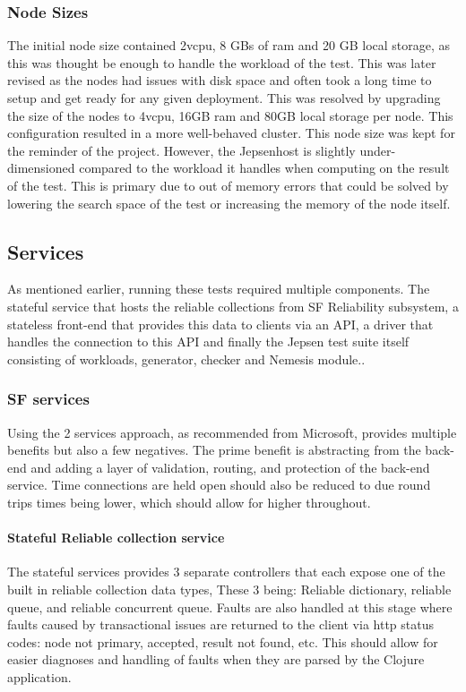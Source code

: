 \documentclass[a4paper,10pt,titlepage]{report}
\begin{document}
    \subsubsection*{Node Sizes}

    The initial node size contained 2vcpu, 8 GBs of ram and 20 GB local storage, as this was thought be enough to handle the workload of the test. This was later revised as the nodes had issues with disk space and often took a long time to setup and get ready for any given deployment. This was resolved by upgrading the size of the nodes to 4vcpu, 16GB ram and 80GB local storage per node. This configuration resulted in a more well-behaved cluster. This node size was kept for the reminder of the project. However, the Jepsenhost is slightly under-dimensioned compared to the workload it handles when computing on the result of the test. This is primary due to out of memory errors that could be solved by lowering the search space of the test or increasing the memory of the node itself.


    \subsection{Services}
    As mentioned earlier, running these tests required multiple components. The stateful service that hosts the reliable collections from SF Reliability subsystem, a stateless front-end that provides this data to clients via an API, a driver that handles the connection to this API and finally the Jepsen test suite itself consisting of workloads, generator, checker and Nemesis module..

    \subsubsection{SF services}
    Using the 2 services approach, as recommended from Microsoft, provides multiple benefits but also a few negatives. The prime benefit is abstracting from the back-end and adding a layer of validation, routing, and protection of the back-end service. Time connections are held open should also be reduced to due round trips times being lower, which should allow for higher throughout.

    \paragraph*{Stateful Reliable collection service}

    The stateful services provides 3 separate controllers that each expose one of the built in reliable collection data types, These 3 being: Reliable dictionary, reliable queue, and reliable concurrent queue. Faults are also handled at this stage where faults caused by transactional issues are returned to the client via http status codes\cite{wikihttpstatuscodes}: node not primary, accepted, result not found, etc. This should allow for easier diagnoses and handling of faults when they are parsed by the Clojure application.
\end{document}
